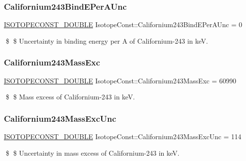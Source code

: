 \subsubsection{\texorpdfstring{Californium243\+Bind\+E\+Per\+A\+Unc}{Californium243BindEPerAUnc}}
{\footnotesize\ttfamily \mbox{\hyperlink{group___isotope_const-_macros_ga8f45a7272ce02c0b4c65c44636ed719a}{I\+S\+O\+T\+O\+P\+E\+C\+O\+N\+S\+T\+\_\+\+D\+O\+U\+B\+LE}} Isotope\+Const\+::\+Californium243\+Bind\+E\+Per\+A\+Unc = 0}

\$ \$ Uncertainty in binding energy per A of Californium-\/243 in keV. \mbox{\label{group___isotope_const-_californium-_cf243_ga680b71d8c478ed4c906c50ca887f9c02}} 
\subsubsection{\texorpdfstring{Californium243\+Mass\+Exc}{Californium243MassExc}}
{\footnotesize\ttfamily \mbox{\hyperlink{group___isotope_const-_macros_ga8f45a7272ce02c0b4c65c44636ed719a}{I\+S\+O\+T\+O\+P\+E\+C\+O\+N\+S\+T\+\_\+\+D\+O\+U\+B\+LE}} Isotope\+Const\+::\+Californium243\+Mass\+Exc = 60990}

\$ \$ Mass excess of Californium-\/243 in keV. \mbox{\label{group___isotope_const-_californium-_cf243_ga6e1a38236c25329a27e13e2a3f767e7e}} 
\subsubsection{\texorpdfstring{Californium243\+Mass\+Exc\+Unc}{Californium243MassExcUnc}}
{\footnotesize\ttfamily \mbox{\hyperlink{group___isotope_const-_macros_ga8f45a7272ce02c0b4c65c44636ed719a}{I\+S\+O\+T\+O\+P\+E\+C\+O\+N\+S\+T\+\_\+\+D\+O\+U\+B\+LE}} Isotope\+Const\+::\+Californium243\+Mass\+Exc\+Unc = 114}

\$ \$ Uncertainty in mass excess of Californium-\/243 in keV. \mbox{\label{group___isotope_const-_californium-_cf243_gaded1ca440290e7cc92f084cd04a0d3a5}} 
